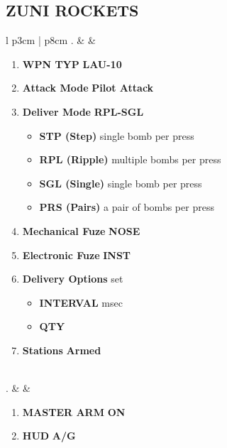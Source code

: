 \documentclass[8pt,usenames,dvipsnames,twoside]{article}
\begin{document}
		\subsection{ZUNI ROCKETS}
		\begin{center}
			\begin{tabular}{l p{3cm} | p{8cm}}
				. &  & 
				\begin{minipage}[t]{\linewidth}
					\vspace{-7pt}
					\begin{enumerate}[label=(\alph*)]
						\item \textbf{WPN TYP} \dotfill \textbf{LAU-10}
						\item \textbf{Attack Mode} \dotfill \textbf{Pilot Attack}
						\item \textbf{Deliver Mode} \dotfill \textbf{RPL-SGL}
						\begin{itemize}
							\item \textbf{STP (Step)} single bomb per press
							\item \textbf{RPL (Ripple)} multiple bombs per press
							\item \textbf{SGL (Single)} single bomb per press
							\item \textbf{PRS (Pairs)} a pair of bombs per press
						\end{itemize}
						\item \textbf{Mechanical Fuze} \dotfill \textbf{NOSE}
						\item \textbf{Electronic Fuze} \dotfill \textbf{INST}
						\item \textbf{Delivery Options} \dotfill set 
						\begin{itemize}
							\item \textbf{INTERVAL}  msec
							\item \textbf{QTY} 
						\end{itemize}
						\item \textbf{Stations} \dotfill \textbf{Armed}
					\end{enumerate}
				\end{minipage} \\
				. &  & 
				\begin{minipage}[t]{\linewidth}
					\vspace{-7pt}
					\begin{enumerate}[label=(\alph*)]
						\item \textbf{MASTER ARM} \dotfill \textbf{ON}
						\item \textbf{HUD} \dotfill \textbf{A/G}

\end{enumerate}
\end{minipage}
\end{tabular}
\end{center}
\end{document}
